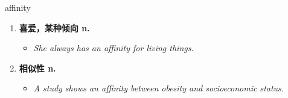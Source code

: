 
\begin{frame}
{\huge affinity}
\begin{center}
\begin{enumerate}\Large
  \item \textbf{喜爱，某种倾向 n.}
  \begin{itemize}
    \item \em{\Large{She always has an affinity for living things.}}
  \end{itemize}
  \item \textbf{相似性 n.}
  \begin{itemize}
    \item \em{\Large{A study shows an affinity between obesity and socioeconomic status.}}
  \end{itemize}
\end{enumerate}
\end{center}
\end{frame}
